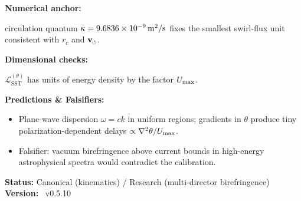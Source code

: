 \documentclass[11pt]{article}
\newcommand{\swirlarrow}{%
	\mathchoice{\mkern-2mu\scriptstyle\boldsymbol{\circlearrowleft}}%
	{\mkern-2mu\scriptstyle\boldsymbol{\circlearrowleft}}%
	{\mkern-2mu\scriptscriptstyle\boldsymbol{\circlearrowleft}}%
	{\mkern-2mu\scriptscriptstyle\boldsymbol{\circlearrowleft}}%
}
\newcommand{\vswirl}{\mathbf{v}_{\swirlarrow}}
\providecommand{\cLight}{c}
\providecommand{\rc}{r_c} %
\begin{document}
\begin{tcolorbox}[title=Rosetta Card: Maxwell/QED $\to$ SST (multi-director swirl)]
        \begin{center}
            \textbf{Numerical anchor:} \
        \end{center}
        circulation quantum $\kappa=\SI{9.6836e-9}{m^2/s}$ fixes the smallest swirl-flux unit consistent with $\rc$ and $\vswirl$.

        \begin{center}
            \textbf{Dimensional checks:}\\
        \end{center}
        $\mathcal{L}_{\text{SST}}^{(\theta)}$ has units of energy density by the factor $U_{\max}$.

        \begin{center}
            \textbf{Predictions \& Falsifiers:}\\
        \end{center}

        \begin{itemize}\itemsep2pt
        \item Plane-wave dispersion $\omega=\cLight k$ in uniform regions; gradients in $\theta$ produce tiny polarization-dependent delays $\propto\nabla^2\theta/U_{\max}$.
        \item Falsifier: vacuum birefringence above current bounds in high-energy astrophysical spectra would contradict the calibration.
        \end{itemize}

        \textbf{Status:} Canonical (kinematics) / Research (multi-director birefringence) \hfill  \textbf{Version:} ~v0.5.10
    \end{tcolorbox}
\end{document}
